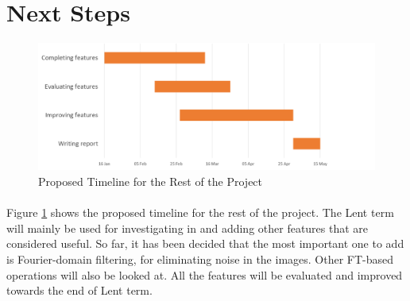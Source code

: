 \documentclass[12pt,a4paper]{article}
\begin{document}
\section{Next Steps}
\begin{figure}[h!]
  \centering
  \includegraphics[scale=0.5]{"Gantt"}
  \caption{Proposed Timeline for the Rest of the Project}
  \label{fig:Next Steps}
\end{figure}

\paragraph{}
Figure \ref{fig:Next Steps} shows the proposed timeline for the rest of the project. The Lent term will mainly be used for investigating in and adding other features that are considered useful. So far, it has been decided that the most important one to add is Fourier-domain filtering, for eliminating noise in the images. Other FT-based operations will also be looked at. All the features will be evaluated and improved towards the end of Lent term.

\printbibliography
\end{document}

